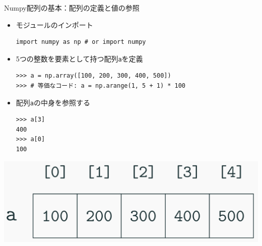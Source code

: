 \documentclass[10pt]{beamer}
\begin{document}
	\begin{frame}[fragile]{Numpy配列の基本：配列の定義と値の参照}
        \begin{itemize}
            \item モジュールのインポート
                \begin{verbatim}
import numpy as np # or import numpy
                \end{verbatim}
            \item 5つの整数を要素として持つ配列\texttt{a}を定義
                \begin{verbatim}
>>> a = np.array([100, 200, 300, 400, 500])
>>> # 等価なコード: a = np.arange(1, 5 + 1) * 100
                \end{verbatim}
            \item 配列\texttt{a}の中身を参照する
                \begin{verbatim}
>>> a[3]
400
>>> a[0]
100
                \end{verbatim}
	    \end{itemize}
	    \begin{center}
	        \includegraphics[width=0.5\hsize]{figs/numpy1.png}
	    \end{center}
	\end{frame}
	
\end{document}
